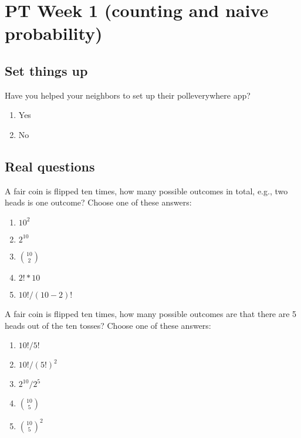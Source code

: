 \documentclass[poll_tutorial_format]{subfiles}
\begin{document}
	\maketitle
	
	\section{PT Week 1 (counting and naive probability)}
	
	\subsection{Set things up}
	\label{sec:set-things-up}
	
	
	
	\setcounter{theorem}{-1}
	\begin{exercise}
		Have you helped your neighbors to set up their polleverywhere app?%
		\begin{enumerate}
			\item Yes
			\item No
		\end{enumerate}
	\end{exercise}
	
	\subsection{Real questions}
	\label{sec:start-real-questions}
	\begin{exercise}
		A fair coin is flipped ten times, how many possible outcomes in total, e.g., two heads is one outcome?		
		Choose one of these answers: %
		\begin{enumerate}
			\item $10^2$
			\item $2^{10}$
			\item ${10\choose 2}$
			\item $2! * 10$
			\item $10!/(10-2)!$
		\end{enumerate}
	\end{exercise}
	
	
	\begin{exercise}
		A fair coin is flipped ten times, how many possible outcomes are that there are 5 heads out of the ten tosses?				
		Choose one of these answers:%
		\begin{enumerate}
			\item $10!/5!$
			\item $10!/(5!)^2$
			\item $2^{10}/2^{5}$
			\item ${10 \choose 5}$
			\item ${10 \choose 5}^2$
		\end{enumerate}
	\end{exercise}
\end{document}

